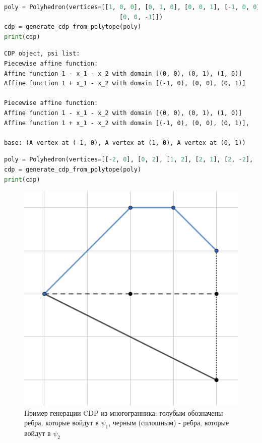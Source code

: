 \documentclass[fontsize=14pt]{scrartcl}
\theoremstyle{definition}
\begin{document}
	
\begin{lstlisting}[language=Python,style=python]
poly = Polyhedron(vertices=[[1, 0, 0], [0, 1, 0], [0, 0, 1], [-1, 0, 0],
                                [0, 0, -1]])
cdp = generate_cdp_from_polytope(poly)
print(cdp)
\end{lstlisting}

\begin{lstlisting}[style=output]
CDP object, psi list:
Piecewise affine function:
Affine function 1 - x_1 - x_2 with domain [(0, 0), (0, 1), (1, 0)]
Affine function 1 + x_1 - x_2 with domain [(-1, 0), (0, 0), (0, 1)]

Piecewise affine function:
Affine function 1 - x_1 - x_2 with domain [(0, 0), (0, 1), (1, 0)]
Affine function 1 + x_1 - x_2 with domain [(-1, 0), (0, 0), (0, 1)],

base: (A vertex at (-1, 0), A vertex at (1, 0), A vertex at (0, 1))
\end{lstlisting}


	
\begin{lstlisting}[language=Python,style=python]
poly = Polyhedron(vertices=[[-2, 0], [0, 2], [1, 2], [2, 1], [2, -2], [-2, -2]])
cdp = generate_cdp_from_polytope(poly)
print(cdp)
\end{lstlisting}

\begin{figure}[!htb]
\centering
  \includegraphics[scale=0.5]{gencdp.png}
  \caption{Пример генерации CDP из многогранника: голубым обозначены ребра, которые войдут в $\psi_1$, черным (сплошным) - ребра, которые войдут в $\psi_2$}\label{correntcdp}
\end{figure}
\end{document}
